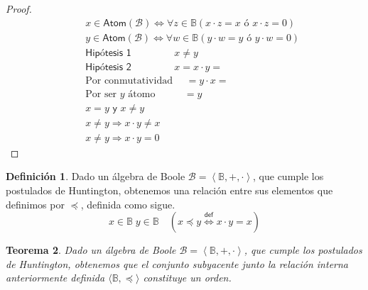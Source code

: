 \documentclass[final,12pt,a4paper,twoside,fleqn]{extbook}
\newcommand{\sthen}{\ensuremath{\Longrightarrow}}
\newcommand{\logicdef}{\ensuremath{
        \stackrel
            {\mathsf{def}}
            {\Longleftrightarrow}
}}
\newcommand{\then}{\ensuremath{\sthen}}
\newcommand{\setB}{\ensuremath{\mathbb{B}}}
\newcommand{\algB}{\ensuremath{\mathscr{B}}}
\newtheorem{thm}{Teorema}[chapter]
\theoremstyle{definition}
\newtheorem{defn}[thm]{Definición}
\theoremstyle{remark}
\begin{document}
\begin{proof}
\begin{eqnarray}
&&x \in \mathsf{Atom}\left({\algB}\right) \iff \forall z \in \setB \left(x
\cdot z = x \textsf{ ó } x \cdot z = 0\right) \\
&&y \in \mathsf{Atom}\left({\algB}\right) \iff \forall w \in \setB \left(y
\cdot w = y \textsf{ ó } y \cdot w = 0\right) \\
&&\textsf{Hipótesis   1   } \qquad\qquad x \neq y \\
&&\textsf{Hipótesis   2   } \qquad\qquad x = x \cdot y = \\
&&\text{Por conmutatividad   } \quad = y \cdot x = \\
&&\text{Por ser \(y\) átomo  } \;\;\qquad = y \\
&& x = y \textsf{ y } x \neq y \\
&& x \neq y \then x \cdot y \neq x \\
&& x \neq y \then x \cdot y = 0
\end{eqnarray}
\end{proof}



\begin{defn}
Dado un álgebra de Boole \(\algB = \left\langle \setB, +, \cdot
\right\rangle\), que cumple los postulados de Huntington, obtenemos una
relación entre sus elementos que definimos por \(\preccurlyeq\), definida
como sigue.
\begin{equation}
x\in\setB\;y\in\setB\quad\left(x \preccurlyeq y \logicdef x \cdot y =
x\right)
\end{equation}
\end{defn}



\begin{thm}
Dado un álgebra de Boole \(\algB = \left\langle \setB, +, \cdot
\right\rangle\), que cumple los postulados de Huntington, obtenemos que el
conjunto subyacente junto la relación interna anteriormente definida
\(\langle\setB,\preccurlyeq\rangle\) constituye un orden.
\end{thm}
\end{document}
